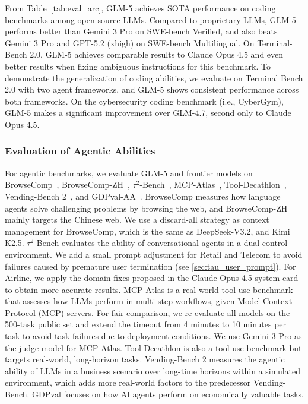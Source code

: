\documentclass{article}
\theoremstyle{definition}
\begin{document}
From Table~\ref{tab:eval_arc}, GLM-5 achieves SOTA performance on coding benchmarks among open-source LLMs. 
Compared to proprietary LLMs, GLM-5 performs better than Gemini 3 Pro on SWE-bench Verified, and also beats Gemini 3 Pro and GPT-5.2 (xhigh) on SWE-bench Multilingual. 
On Terminal-Bench 2.0, GLM-5 achieves comparable results to Claude Opus 4.5 and even better results when fixing ambiguous instructions for this benchmark. 
To demonstrate the generalization of coding abilities, we evaluate on Terminal Bench 2.0 with two agent frameworks, and GLM-5 shows consistent performance across both frameworks. 
On the cybersecurity coding benchmark (i.e., CyberGym), GLM-5 makes a significant improvement over GLM-4.7, second only to Claude Opus 4.5. 

\subsubsection{Evaluation of Agentic Abilities}

For agentic benchmarks, we evaluate GLM-5 and frontier models on BrowseComp~\cite{wei2025browsecomp}, BrowseComp-ZH~\cite{zhou2025browsecompzh}, $\tau^2$-Bench~\cite{barres2025tau2}, MCP-Atlas~\cite{bandi2026mcp}, Tool-Decathlon~\cite{li2025tool}, Vending-Bench 2~\cite{backlund2025vending}, and GDPval-AA~\cite{patwardhan2025gdpval}. 
BrowseComp measures how language agents solve challenging problems by browsing the web, and BrowseComp-ZH mainly targets the Chinese web. 
We use a discard-all strategy as context management for BrowseComp, which is the same as DeepSeek-V3.2, and Kimi K2.5. 
$\tau^2$-Bench evaluates the ability of conversational agents in a dual-control environment. We add a small prompt adjustment for Retail and Telecom to avoid failures caused by premature user termination (see \ref{sec:tau_user_prompt}). For Airline, we apply the domain fixes proposed in the Claude Opus 4.5 system card~\cite{opus4.5} to obtain more accurate results.
MCP-Atlas is a real-world tool-use benchmark that assesses how LLMs perform in multi-step workflows, given Model Context Protocol (MCP) servers. For fair comparison, we re-evaluate all models on the 500-task public set and extend the timeout from 4 minutes to 10 minutes per task to avoid task failures due to deployment conditions. We use Gemini 3 Pro as the judge model for MCP-Atlas. 
Tool-Decathlon is also a tool-use benchmark but targets real-world, long-horizon tasks. 
Vending-Bench 2 measures the agentic ability of LLMs in a business scenario over long-time horizons within a simulated environment, which adds more real-world factors to the predecessor Vending-Bench. 
GDPval focuses on how AI agents perform on economically valuable tasks.  
\end{document}

